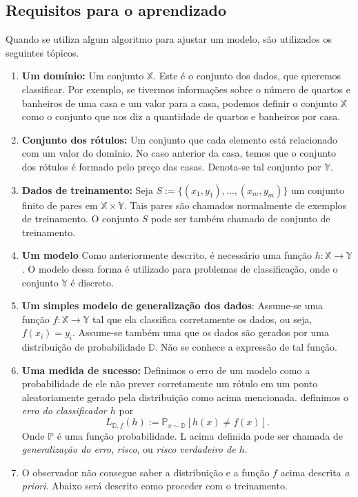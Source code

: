 \documentclass[
	12pt,				%
    oneside,			%
	a4paper,			%
	english,			%
	french,				%
	spanish,			%
	brazil,				%
	]{abntex2}
\begin{document}
        \subsection{Requisitos para o aprendizado}
            Quando se utiliza algum algoritmo para ajustar um modelo, são utilizados os seguintes tópicos.
            \begin{enumerate}
                \item \textbf{Um domínio:} Um conjunto $\mathbb{X}$. Este é o conjunto dos dados, que queremos classificar. Por exemplo, se tivermos informações sobre o número de quartos e banheiros de uma casa e um valor para a casa, podemos definir o conjunto $\mathbb{X}$ como o conjunto que nos diz a quantidade de quartos e banheiros por casa.
                \item \textbf{Conjunto dos rótulos:} Um conjunto que cada elemento está relacionado com um valor do domínio. No caso anterior da casa, temos que o conjunto dos rótulos é formado pelo preço das casas. Denota-se tal conjunto por $\mathbb{Y}$.
                \item \textbf{Dados de treinamento:} Seja $S := \{(x_1, y_1), \dots, (x_m,y_m)\}$ um conjunto finito de pares em $\mathbb{X}\times \mathbb{Y}$. Tais pares são chamados normalmente de exemplos de treinamento. O conjunto $S$ pode ser também chamado de conjunto de treinamento.
                \item \textbf{Um modelo} Como anteriormente descrito, é necessário uma função $h: \mathbb{X} \to \mathbb{Y}$. O modelo dessa forma é utilizado para problemas de classificação, onde o conjunto $\mathbb{Y}$ é discreto.
                \item \textbf{Um simples modelo de generalização dos dados}: Assume-se uma função $f:\mathbb{X} \to \mathbb{Y}$ tal que ela classifica corretamente os dados, ou seja, $f(x_i) = y_i$. Assume-se também uma que os dados são gerados por uma distribuição de probabilidade $\mathbb{D}$. Não se conhece a expressão de tal função.
                \item \textbf{Uma medida de sucesso:} Definimos o erro de um modelo como a probabilidade de ele não prever corretamente um rótulo em um ponto aleatoriamente gerado pela distribuição como acima mencionada. definimos o \emph{erro do classificador $h$} por
                \begin{equation*}
                    L_{\mathbb{D}, f}(h) := \mathbb{P}_{x \sim \mathbb{D}} [h(x) \neq f(x)].
                \end{equation*}
                Onde $\mathbb{P}$ é uma função probabilidade.
                L acima definida pode ser chamada de \emph{generalização do erro}, \emph{risco}, ou \emph{risco verdadeiro de $h$}.
                \item O observador não consegue saber a distribuição e a função $f$ acima descrita \emph{a priori}. Abaixo será descrito como proceder com o treinamento.
            \end{enumerate}
\end{document}
